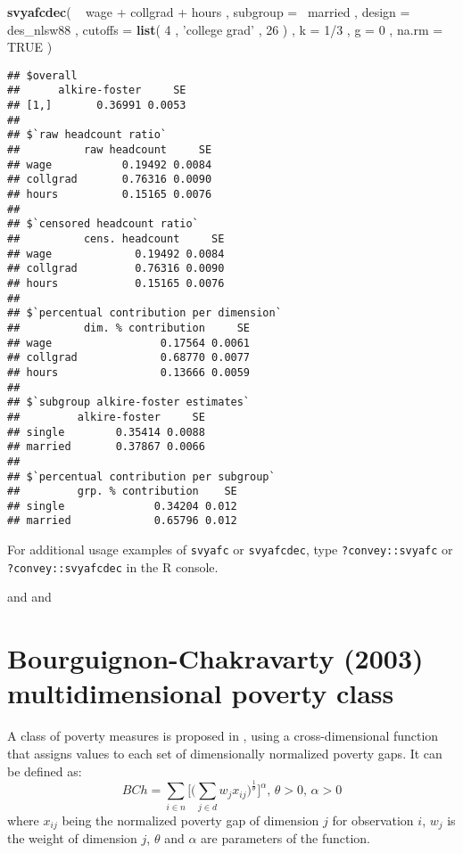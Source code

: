 \documentclass[]{book}
\newenvironment{Shaded}{\begin{snugshade}}{\end{snugshade}}
\newcommand{\KeywordTok}[1]{\textcolor[rgb]{0.13,0.29,0.53}{\textbf{{#1}}}}
\newcommand{\DataTypeTok}[1]{\textcolor[rgb]{0.13,0.29,0.53}{{#1}}}
\newcommand{\DecValTok}[1]{\textcolor[rgb]{0.00,0.00,0.81}{{#1}}}
\newcommand{\StringTok}[1]{\textcolor[rgb]{0.31,0.60,0.02}{{#1}}}
\newcommand{\OtherTok}[1]{\textcolor[rgb]{0.56,0.35,0.01}{{#1}}}
\newcommand{\NormalTok}[1]{{#1}}
\theoremstyle{definition}
\theoremstyle{definition}
\theoremstyle{remark}
\begin{document}
\begin{Shaded}
\begin{Highlighting}[]
\KeywordTok{svyafcdec}\NormalTok{(}
    \NormalTok{~}\StringTok{ }\NormalTok{wage +}\StringTok{ }\NormalTok{collgrad +}\StringTok{ }\NormalTok{hours , }
    \DataTypeTok{subgroup =} \NormalTok{~married , }
    \DataTypeTok{design =} \NormalTok{des_nlsw88 , }
    \DataTypeTok{cutoffs =} \KeywordTok{list}\NormalTok{( }\DecValTok{4} \NormalTok{, }\StringTok{'college grad'} \NormalTok{, }\DecValTok{26} \NormalTok{) , }
    \DataTypeTok{k =} \DecValTok{1}\NormalTok{/}\DecValTok{3} \NormalTok{, }
    \DataTypeTok{g =} \DecValTok{0} \NormalTok{,}
    \DataTypeTok{na.rm =} \OtherTok{TRUE}
\NormalTok{)}
\end{Highlighting}
\end{Shaded}

\begin{verbatim}
## $overall
##      alkire-foster     SE
## [1,]       0.36991 0.0053
## 
## $`raw headcount ratio`
##          raw headcount     SE
## wage           0.19492 0.0084
## collgrad       0.76316 0.0090
## hours          0.15165 0.0076
## 
## $`censored headcount ratio`
##          cens. headcount     SE
## wage             0.19492 0.0084
## collgrad         0.76316 0.0090
## hours            0.15165 0.0076
## 
## $`percentual contribution per dimension`
##          dim. % contribution     SE
## wage                 0.17564 0.0061
## collgrad             0.68770 0.0077
## hours                0.13666 0.0059
## 
## $`subgroup alkire-foster estimates`
##         alkire-foster     SE
## single        0.35414 0.0088
## married       0.37867 0.0066
## 
## $`percentual contribution per subgroup`
##         grp. % contribution    SE
## single              0.34204 0.012
## married             0.65796 0.012
\end{verbatim}

For additional usage examples of \texttt{svyafc} or \texttt{svyafcdec},
type \texttt{?convey::svyafc} or \texttt{?convey::svyafcdec} in the R
console.

\citep{alkire2011} and \citep{alkire2015} and \citep{pacifico2016}

\section{Bourguignon-Chakravarty (2003) multidimensional poverty
class}\label{bourguignon-chakravarty-2003-multidimensional-poverty-class}

A class of poverty measures is proposed in \citet{bourguignon2003},
using a cross-dimensional function that assigns values to each set of
dimensionally normalized poverty gaps. It can be defined as: \[
BCh = \sum_{i \in n} \bigg[ \bigg( \sum_{j \in d} w_{j} x_{ij} \bigg)^{\frac{1}{\theta}} \bigg]^\alpha \text{, } \theta > 0 \text{, } \alpha > 0
\] where \(x_{ij}\) being the normalized poverty gap of dimension \(j\)
for observation \(i\), \(w_j\) is the weight of dimension \(j\),
\(\theta\) and \(\alpha\) are parameters of the function.
\end{document}
